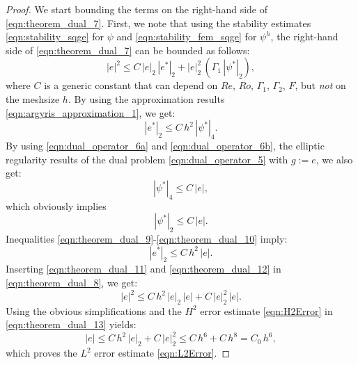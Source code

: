 \begin{proof}
  We start bounding the terms on the right-hand side of
  \eqref{eqn:theorem_dual_7}.  First, we note that using the stability estimates
  \eqref{eqn:stability_sqge} for $\psi$ and \eqref{eqn:stability_fem_sqge} for
  $\psi^h$, the right-hand side of \eqref{eqn:theorem_dual_7} can be bounded as
  follows:
  \begin{equation}
    |e|^2 \leq C \, | e |_2 \, |e^* |_2 + | e |_2^2 \,
      \left( \Gamma_1 \, | \psi^* |_2 \right) ,
    \label{eqn:theorem_dual_8}
  \end{equation}
  where $C$ is a generic constant that can depend on $Re$, $Ro$, $\Gamma_1$,
  $\Gamma_2$, $F$, but \emph{not} on the meshsize $h$.  By using the
  approximation results \eqref{eqn:argyris_approximation_1}, we get:
  \begin{equation}
    |e^* |_2 \leq C \, h^2 \, | \psi^* |_4 .
    \label{eqn:theorem_dual_9}
  \end{equation}
  By using \eqref{eqn:dual_operator_6a} and \eqref{eqn:dual_operator_6b}, the
  elliptic regularity results of the dual problem \eqref{eqn:dual_operator_5}
  with $g := e$, we also get:
  \begin{equation}
    | \psi^* |_4 \leq C \, | e | ,
    \label{eqn:theorem_dual_10}
  \end{equation}
  which obviously implies
  \begin{equation}
    | \psi^* |_2 \leq C \, | e | .
    \label{eqn:theorem_dual_11}
  \end{equation}
  Inequalities \eqref{eqn:theorem_dual_9}-\eqref{eqn:theorem_dual_10} imply:
  \begin{equation}
    |e^* |_2 \leq C \, h^2 \, | e | .
    \label{eqn:theorem_dual_12}
  \end{equation}
  Inserting \eqref{eqn:theorem_dual_11} and \eqref{eqn:theorem_dual_12}  in
  \eqref{eqn:theorem_dual_8}, we get:
  \begin{equation}
    |e|^2 \leq C \, h^2 \, | e |_2 \, | e | + C \, | e |_2^2 \, | e | .
    \label{eqn:theorem_dual_13}
  \end{equation}
  Using the obvious simplifications and the $H^2$ error estimate
  \eqref{eqn:H2Error} in \eqref{eqn:theorem_dual_13} yields:
  \begin{equation}
    |e| \leq C \, h^2 \, | e |_2 + C \, | e |_2^2 \leq C \, h^6 + C \, h^8
      = C_0 \, h^6 ,
    \label{eqn:theorem_dual_14}
  \end{equation}
  which proves the $L^2$ error estimate \eqref{eqn:L2Error}.


\end{proof}
